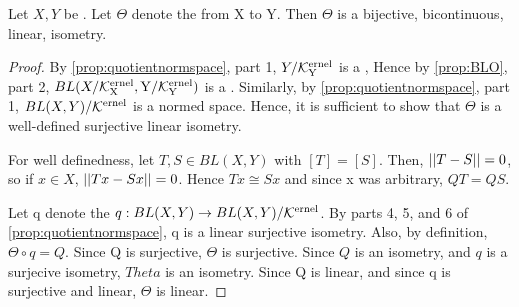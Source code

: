 \begin{prop}
\label{prop:canonicalisomorphism}
    Let $X,Y$ be \SeminormedSpaces.
    Let $\Theta$ denote the \CanonicalIso
    from X to Y. 
    Then $\Theta$ is
    a bijective, bicontinuous, linear, isometry. 
    \begin{proof}
       By \ref{prop:quotientnormspace}, part 1, 
       $Y/\bf\mathcal{K}\rm^{ernel}_Y$ is a \NormedSpace, 
       Hence by \ref{prop:BLO}, part 2, 
       \newline
       $BL(X/\bf\mathcal{K}\rm^{ernel}_X, Y/\bf\mathcal{K}\rm^{ernel}_Y)$ is a \NormedSpace. 
       Similarly, by \ref{prop:quotientnormspace}, part 1, 
       $BL(X,Y)/\bf\mathcal{K}\rm^{ernel}$ is a normed space. 
       Hence, it is sufficient to show that $\Theta$ is a
       well-defined surjective linear isometry. 

       For well definedness, let $T,S \in BL(X,Y)$ with $[T]=[S]$. 
       Then, $\left|\left| T-S \right|\right|=0$, so 
       if $x \in X$, $\left|\left| Tx-Sx \right|\right|=0$. 
       Hence $Tx \cong Sx$ and since x was arbitrary, 
       $QT=QS$. 
        
       Let q denote the \QuotientMap $q:BL(X,Y) \to BL(X,Y)/\bf\mathcal{K}\rm^{ernel}$. 
       By parts 4, 5, and 6 of \ref{prop:quotientnormspace}, 
       q is a linear surjective isometry. 
       Also, by definition, $\Theta \circ q = Q$. 
       Since Q is surjective, $\Theta$ is surjective. 
       Since $Q$ is an isometry, and $q$ is a surjecive isometry, 
       $Theta$ is an isometry. 
       Since Q is linear, and since q is surjective and linear, 
       $\Theta$ is linear. 
    \end{proof}


\end{prop}
